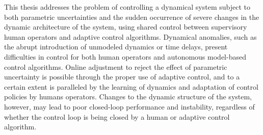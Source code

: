 % 
% 
%



This thesis addresses the problem of controlling a dynamical system subject to both parametric uncertainties and the sudden occurrence of severe changes in the dynamic architecture of the system, using shared control between supervisory human operators and adaptive control algorithms. Dynamical anomalies, such as the abrupt introduction of unmodeled dynamics or time delays, present difficulties in control for both human operators and autonomous model-based control algorithms. Online adjustment to reject the effect of parametric uncertainty is possible through the proper use of adaptive control, and to a certain extent is paralleled by the learning of dynamics and adaptation of control policies by humans operators. Changes to the dynamic structure of the system, however, may lead to poor closed-loop performance and instability, regardless of whether the control loop is being closed by a human or adaptive control algorithm.

